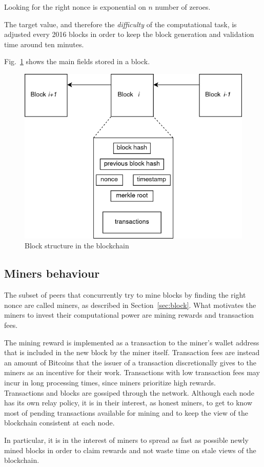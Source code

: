 \documentclass[12pt, letterpaper, twoside]{article}
\begin{document}
Looking for the right nonce is exponential on $n$ number of zeroes.

The target value, and therefore the \emph{difficulty} of the computational task, is adjusted every 2016 blocks in order to keep the block generation and validation time around ten minutes.

Fig.~\ref{fig:blockstruct} shows the main fields stored in a block.

\begin{figure}[h]
	\includegraphics[width=.55\textwidth]{pict/blockstruct.png}
	\centering
	\caption{Block structure in the blockchain}
	\label{fig:blockstruct}
\end{figure}

\subsection{Miners behaviour}\label{sec:miners}
The subset of peers that concurrently try to mine blocks by finding the right nonce are called miners, as described in Section~\ref{sec:block}. What motivates the miners to invest their computational power are mining rewards and transaction fees.

The mining reward is implemented as a transaction to the miner's wallet address that is included in the new block by the miner itself. Transaction fees are instead an amount of Bitcoins that the issuer of a transaction discretionally gives to the miners as an incentive for their work. Transactions with low transaction fees may incur in long processing times, since miners prioritize high rewards.\\

Transactions and blocks are gossiped through the network. Although each node has its own relay policy, it is in their interest, as honest miners, to get to know most of pending transactions available for mining and to keep the view of the blockchain consistent at each node.

In particular, it is in the interest of miners to spread as fast as possible newly mined blocks in order to claim rewards and not waste time on stale views of the blockchain.
\end{document}
